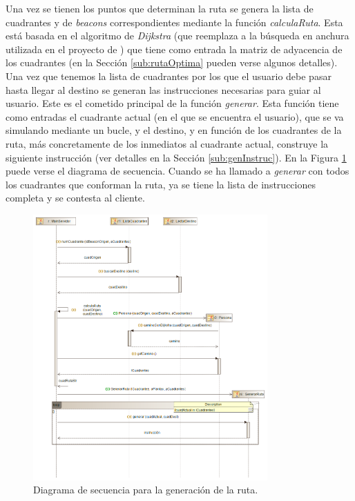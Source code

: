 \begin{itemize}
	Una vez se tienen los puntos que determinan la ruta se genera la lista de cuadrantes y de \textit{beacons} correspondientes mediante la función \textit{calculaRuta}. Esta está basada en el algoritmo de \textit{Dijkstra} (que reemplaza a la búsqueda en anchura utilizada en el proyecto de \cite{TFGguia}) que tiene como entrada la matriz de adyacencia de los cuadrantes (en la Sección \ref{sub:rutaOptima} pueden verse algunos detalles). Una vez que tenemos la lista de cuadrantes por los que el usuario debe pasar hasta llegar al destino se generan las instrucciones necesarias para guiar al usuario. Este es el cometido principal de la función \textit{generar}. Esta función tiene como entradas el cuadrante actual (en el que se encuentra el usuario), que se va simulando mediante un bucle, y el destino, y en función de los cuadrantes de la ruta, más concretamente de los inmediatos al cuadrante actual, construye la siguiente instrucción (ver detalles en la Sección \ref{sub:genInstruc}). En la Figura \ref{fig:diag_sec_conexionYRutaServ} puede verse el diagrama de secuencia.	Cuando se ha llamado a \textit{generar} con todos los cuadrantes que conforman la ruta, ya se tiene la lista de instrucciones completa y se contesta al cliente. 
\end{itemize}




\begin{figure}[t]
	\centering
	\includegraphics[width=0.8\textwidth]{Imagenes/Capitulo4/diagramasUML/generacionRuta}
	\caption{Diagrama de secuencia para la generación de la ruta.}
	\label{fig:diag_sec_conexionYRutaServ}
\end{figure}



